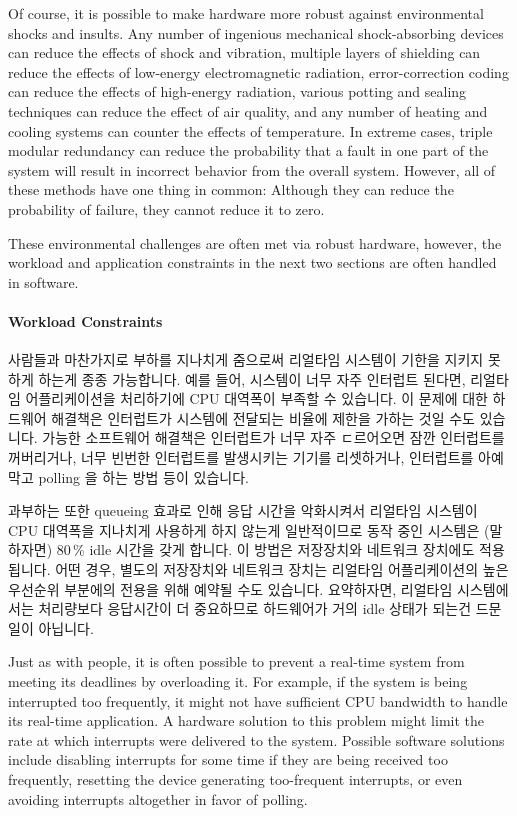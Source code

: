 Of course, it is possible to make hardware more robust against
environmental shocks and insults.
Any number of ingenious mechanical shock-absorbing devices can reduce the
effects of shock and vibration, multiple layers of shielding can reduce
the effects of low-energy electromagnetic radiation, error-correction
coding can reduce the effects of high-energy radiation, various potting
and sealing techniques can reduce the effect of air quality, and any
number of heating and cooling systems can counter the effects of temperature.
In extreme cases, triple modular redundancy can reduce the probability that
a fault in one part of the system will result in incorrect behavior from
the overall system.
However, all of these methods have one thing in common:  Although they
can reduce the probability of failure, they cannot reduce it to zero.

These environmental challenges are often met via robust hardware, however,
the workload and application constraints in the next two sections are
often handled in software.

\fi

\paragraph{Workload Constraints}
\label{sec:advsync:Workload Constraints}

사람들과 마찬가지로 부하를 지나치게 줌으로써 리얼타임 시스템이 기한을 지키지
못하게 하는게 종종 가능합니다.
예를 들어, 시스템이 너무 자주 인터럽트 된다면, 리얼타임 어플리케이션을
처리하기에 CPU 대역폭이 부족할 수 있습니다.
이 문제에 대한 하드웨어 해결책은 인터럽트가 시스템에 전달되는 비율에 제한을
가하는 것일 수도 있습니다.
가능한 소프트웨어 해결책은 인터럽트가 너무 자주 ㄷ르어오면 잠깐 인터럽트를
꺼버리거나, 너무 빈번한 인터럽트를 발생시키는 기기를 리셋하거나, 인터럽트를
아예 막고 polling 을 하는 방법 등이 있습니다.

과부하는 또한 queueing 효과로 인해 응답 시간을 악화시켜서 리얼타임 시스템이 CPU
대역폭을 지나치게 사용하게 하지 않는게 일반적이므로 동작 중인 시스템은
(말하자면) 80\,\% idle 시간을 갖게 합니다.
이 방법은 저장장치와 네트워크 장치에도 적용됩니다.
어떤 경우, 별도의 저장장치와 네트워크 장치는 리얼타임 어플리케이션의 높은
우선순위 부분에의 전용을 위해 예약될 수도 있습니다.
요약하자면, 리얼타임 시스템에서는 처리량보다 응답시간이 더 중요하므로
하드웨어가 거의 idle 상태가 되는건 드문 일이 아닙니다.

\iffalse

Just as with people, it is often possible to prevent a real-time system
from meeting its deadlines by overloading it.
For example, if the system is being interrupted too frequently, it might
not have sufficient CPU bandwidth to handle its real-time application.
A hardware solution to this problem might limit the rate at which
interrupts were delivered to the system.
Possible software solutions include disabling interrupts for some time if
they are being received too frequently,
resetting the device generating too-frequent interrupts,
or even avoiding interrupts altogether in favor of polling.

